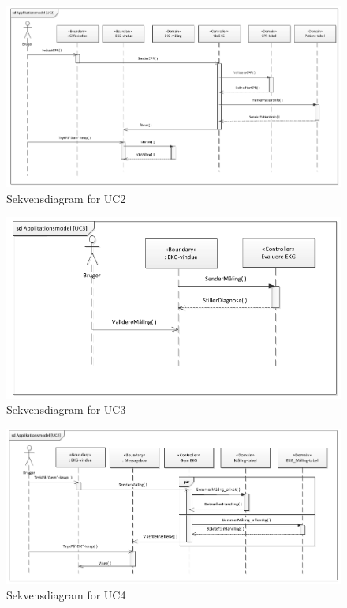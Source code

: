 \begin{figure}[H]
	\centering
	\includegraphics[width=1\textwidth]{Figurer/Snip20150429_33}
	\caption{Sekvensdiagram for UC2}
\end{figure}

\begin{figure}[H]
	\centering
	\includegraphics[width=1\textwidth]{Figurer/Snip20150429_31}
	\caption{Sekvensdiagram for UC3}
\end{figure}

\begin{figure}[H]
	\centering
	\includegraphics[width=1\textwidth]{Figurer/Snip20150525_21}
	\caption{Sekvensdiagram for UC4}
\end{figure}

